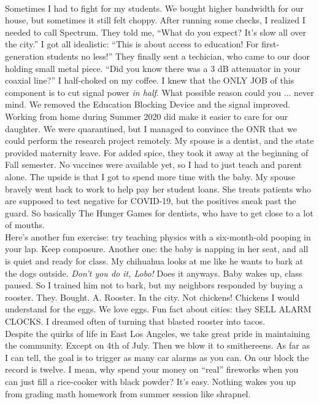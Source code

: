 \documentclass[../../main.tex]{subfiles}
\begin{document}
\\
\vspace{0.15cm}
Sometimes I had to fight for my students.  We bought higher bandwidth for our house, but sometimes it still felt choppy.  After running some checks, I realized I needed to call Spectrum.  They told me, ``What do you expect?  It's slow all over the city.''  I got all idealistic: ``This is about access to education!  For first-generation students no less!'' They finally sent a techician, who came to our door holding small metal piece.  ``Did you know there was a 3 dB attenuator in your coaxial line?''  I half-choked on my coffee.  I knew that the ONLY JOB of this component is to cut signal power \textit{in half}.  What possible reason could you ... never mind.  We removed the Education Blocking Device and the signal improved.
\\
\vspace{0.15cm}
Working from home during Summer 2020 did make it easier to care for our daughter.  We were quarantined, but I managed to convince the ONR that we could perform the research project remotely.  My spouse is a dentist, and the state provided maternity leave.  For added spice, they took it away at the beginning of Fall semester.  No vaccines were available yet, so I had to just teach and parent alone.  The upside is that I got to spend more time with the baby.  My spouse bravely went back to work to help pay her student loans.  She treats patients who are supposed to test negative for COVID-19, but the positives sneak past the guard.  So basically The Hunger Games for dentists, who have to get close to a lot of mouths.
\\
\vspace{0.15cm}
Here's another fun exercise: try teaching physics with a six-month-old pooping in your lap.  Keep composure.  Another one: the baby is napping in her seat, and all is quiet and ready for class.  My chihuahua looks at me like he wants to bark at the dogs outside.  \textit{Don't you do it, Lobo!} Does it anyways.  Baby wakes up, class paused.  So I trained him not to bark, but my neighbors responded by buying a rooster.  They. Bought. A. Rooster.  In the city.  Not chickens!  Chickens I would understand for the eggs.  We love eggs.  Fun fact about cities: they SELL ALARM CLOCKS.  I dreamed often of turning that blasted rooster into tacos.
\\
\vspace{0.15cm}
Despite the quirks of life in East Los Angeles, we take great pride in maintaining the community.  Except on 4th of July.  Then we blow it to smithereens.  As far as I can tell, the goal is to trigger as many car alarms as you can.  On our block the record is twelve.  I mean, why spend your money on ``real'' fireworks when you can just fill a rice-cooker with black powder?  It's easy.  Nothing wakes you up from grading math homework from summer session like shrapnel.
\end{document}
